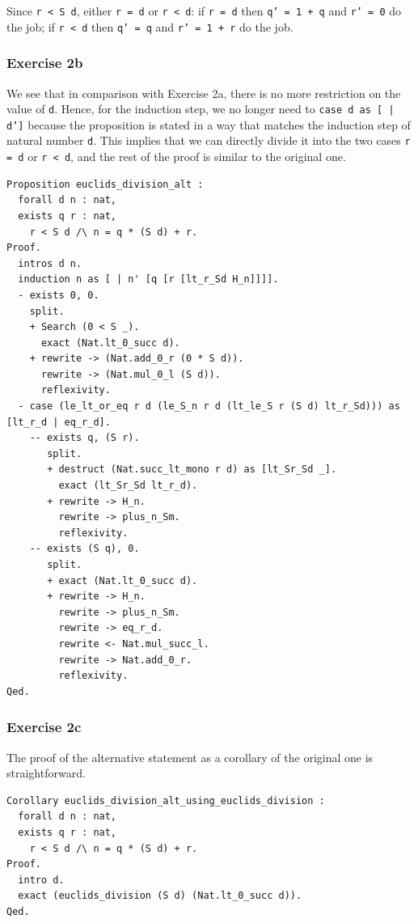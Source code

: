 \documentclass{article}
\begin{document}
Since \texttt{r < S d}, either \texttt{r = d} or \texttt{r < d}:
if \texttt{r = d} then \texttt{q' = 1 + q} and \texttt{r' = 0} do the job;
if \texttt{r < d} then \texttt{q' = q} and \texttt{r' = 1 + r} do the job.

\subsubsection{Exercise 2b}

We see that in comparison with Exercise 2a, there is no more restriction on the value of \texttt{d}. Hence, for the induction step, we no longer need to \texttt{case d as [ | d']} because the proposition is stated in a way that matches the induction step of natural number \texttt{d}. This implies that we can directly divide it into the two cases \texttt{r = d} or \texttt{r < d}, and the rest of the proof is similar to the original one.

\begin{lstlisting}
Proposition euclids_division_alt :
  forall d n : nat,
  exists q r : nat,
    r < S d /\ n = q * (S d) + r.
Proof.
  intros d n.
  induction n as [ | n' [q [r [lt_r_Sd H_n]]]].
  - exists 0, 0.
    split.
    + Search (0 < S _).
      exact (Nat.lt_0_succ d).
    + rewrite -> (Nat.add_0_r (0 * S d)).
      rewrite -> (Nat.mul_0_l (S d)).
      reflexivity.
  - case (le_lt_or_eq r d (le_S_n r d (lt_le_S r (S d) lt_r_Sd))) as [lt_r_d | eq_r_d].
    -- exists q, (S r).
       split.
       + destruct (Nat.succ_lt_mono r d) as [lt_Sr_Sd _].
         exact (lt_Sr_Sd lt_r_d).
       + rewrite -> H_n.
         rewrite -> plus_n_Sm.
         reflexivity.
    -- exists (S q), 0.
       split.
       + exact (Nat.lt_0_succ d).
       + rewrite -> H_n.
         rewrite -> plus_n_Sm.
         rewrite -> eq_r_d.
         rewrite <- Nat.mul_succ_l.
         rewrite -> Nat.add_0_r.
         reflexivity.
Qed.
\end{lstlisting}

\subsubsection{Exercise 2c}
The proof of the alternative statement as a corollary of the original one is straightforward.

\begin{lstlisting}
Corollary euclids_division_alt_using_euclids_division :
  forall d n : nat,
  exists q r : nat,
    r < S d /\ n = q * (S d) + r.
Proof.
  intro d.
  exact (euclids_division (S d) (Nat.lt_0_succ d)).
Qed.
\end{lstlisting}
\end{document}
